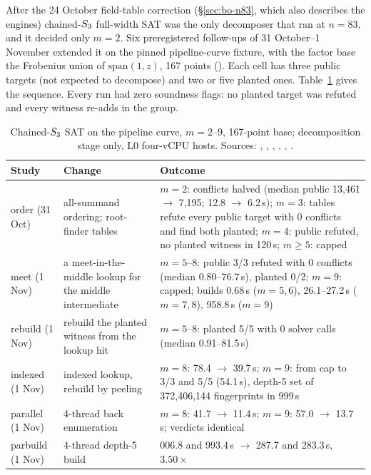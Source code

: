 After the 24 October field-table correction (\S\ref{sec:bo-n83}, which also
describes the engines) chained-$S_{3}$
full-width SAT was the only decomposer that ran at $n=83$, and it decided
only $m=2$. Six preregistered follow-ups of 31 October--1 November extended
it on the pinned pipeline-curve fixture, with the factor base the Frobenius
union of $\mathrm{span}(1,z)$, 167 points
(). Each cell has
three public targets (not expected to decompose) and two or five planted
ones. Table~\ref{tab:n83l-sat} gives the sequence. Every run had zero
soundness flags: no planted target was refuted and every witness re-adds in
the group.

\begin{table}[t]
\centering\small
\begin{tabularx}{\linewidth}{@{}l>{\raggedright}X>{\raggedright\arraybackslash}X@{}}
\toprule
Study & Change & Outcome \\
\midrule
order (31 Oct) & all-summand ordering; root-finder tables & $m=2$: conflicts halved (median public 13{,}461 $\to$ 7{,}195; 12.8 $\to$ 6.2\,s); $m=3$: tables refute every public target with 0 conflicts and find both planted; $m=4$: public refuted, no planted witness in 120\,s; $m\ge5$: capped \\
meet (1 Nov) & a meet-in-the-middle lookup for the middle intermediate & $m=5$--8: public 3/3 refuted with 0 conflicts (median 0.80--76.7\,s), planted 0/2; $m=9$: capped; builds 0.68\,s ($m=5,6$), 26.1--27.2\,s ($m=7,8$), 958.8\,s ($m=9$) \\
rebuild (1 Nov) & rebuild the planted witness from the lookup hit & $m=5$--8: planted 5/5 with 0 solver calls (median 0.91--81.5\,s) \\
indexed (1 Nov) & indexed lookup, rebuild by peeling & $m=8$: 78.4 $\to$ 39.7\,s; $m=9$: from cap to 3/3 and 5/5 (54.1\,s), depth-5 set of 372{,}406{,}144 fingerprints in 999\,s \\
parallel (1 Nov) & 4-thread back enumeration & $m=8$: 41.7 $\to$ 11.4\,s; $m=9$: 57.0 $\to$ 13.7\,s; verdicts identical \\
parbuild (1 Nov) & 4-thread depth-5 build & 1{,}006.8 and 993.4\,s $\to$ 287.7 and 283.3\,s, $3.50\times$ \\
\bottomrule
\end{tabularx}
\caption[]{Chained-$S_{3}$ SAT on the pipeline curve, $m=2$--9, 167-point
base; decomposition stage only, L0 four-vCPU hosts. Sources:
,
,
,
,
,
.}
\label{tab:n83l-sat}
\end{table}

